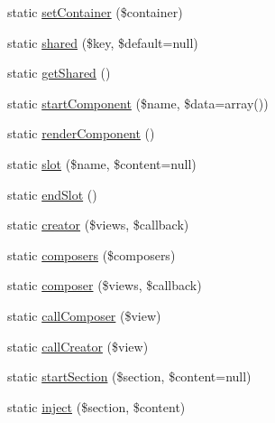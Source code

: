 \begin{DoxyCompactItemize}
\item 
static \mbox{\hyperlink{class_illuminate_1_1_support_1_1_facades_1_1_view_a1c1710aeaf5c516630a02d3243f1796e}{set\+Container}} (\$container)
\item 
static \mbox{\hyperlink{class_illuminate_1_1_support_1_1_facades_1_1_view_ab1abe658676a7b703a8d32a25ffaec2f}{shared}} (\$key, \$default=null)
\item 
static \mbox{\hyperlink{class_illuminate_1_1_support_1_1_facades_1_1_view_afa2c1209a06ace8a20038c0c5471a68b}{get\+Shared}} ()
\item 
static \mbox{\hyperlink{class_illuminate_1_1_support_1_1_facades_1_1_view_a5697dc1b52b5fc79e9bac5a6b733cb8b}{start\+Component}} (\$name, \$data=array())
\item 
static \mbox{\hyperlink{class_illuminate_1_1_support_1_1_facades_1_1_view_ab36e07ba8d631ad84d871958d1347466}{render\+Component}} ()
\item 
static \mbox{\hyperlink{class_illuminate_1_1_support_1_1_facades_1_1_view_aec65aac46f076dc541bd02c8af12664c}{slot}} (\$name, \$content=null)
\item 
static \mbox{\hyperlink{class_illuminate_1_1_support_1_1_facades_1_1_view_a5501ede637043e746bf37d08dec1f61a}{end\+Slot}} ()
\item 
static \mbox{\hyperlink{class_illuminate_1_1_support_1_1_facades_1_1_view_abc6f6928485d76ab6921d6db9bd30ce7}{creator}} (\$views, \$callback)
\item 
static \mbox{\hyperlink{class_illuminate_1_1_support_1_1_facades_1_1_view_a5aaed150b4f8239b74e777693a30b758}{composers}} (\$composers)
\item 
static \mbox{\hyperlink{class_illuminate_1_1_support_1_1_facades_1_1_view_a7979fa1c5fc812ee65fdcc343eb73b2b}{composer}} (\$views, \$callback)
\item 
static \mbox{\hyperlink{class_illuminate_1_1_support_1_1_facades_1_1_view_a7639d4555e9d25ea8d0a08a5f5fbdfaa}{call\+Composer}} (\$view)
\item 
static \mbox{\hyperlink{class_illuminate_1_1_support_1_1_facades_1_1_view_aded447db3cf7072659a0446830b02711}{call\+Creator}} (\$view)
\item 
static \mbox{\hyperlink{class_illuminate_1_1_support_1_1_facades_1_1_view_a9c7205e5696e3f786bd9fa1344eb6b6b}{start\+Section}} (\$section, \$content=null)
\item 
static \mbox{\hyperlink{class_illuminate_1_1_support_1_1_facades_1_1_view_a8b4834ed14b95d0f092685666b4759c9}{inject}} (\$section, \$content)
\item 

\end{DoxyCompactItemize}
